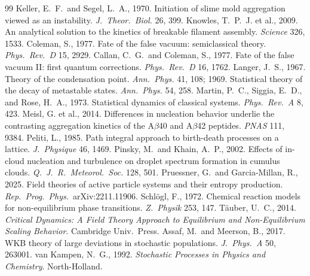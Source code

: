 \documentclass[11pt,a4paper]{article}
\theoremstyle{plain}
\begin{document}
\begin{thebibliography}{99}
 Keller, E.~F.\ and Segel, L.~A., 1970. Initiation of slime mold aggregation viewed as an instability. \textit{J.\ Theor.\ Biol.} 26, 399.
 Knowles, T.~P.~J. et al., 2009. An analytical solution to the kinetics of breakable filament assembly. \textit{Science} 326, 1533.
 Coleman, S., 1977. Fate of the false vacuum: semiclassical theory. \textit{Phys.\ Rev.\ D} 15, 2929.
 Callan, C.~G.\ and Coleman, S., 1977. Fate of the false vacuum II: first quantum corrections. \textit{Phys.\ Rev.\ D} 16, 1762.
 Langer, J.~S., 1967. Theory of the condensation point. \textit{Ann.\ Phys.} 41, 108; 1969. Statistical theory of the decay of metastable states. \textit{Ann.\ Phys.} 54, 258.
 Martin, P.~C., Siggia, E.~D., and Rose, H.~A., 1973. Statistical dynamics of classical systems. \textit{Phys.\ Rev.\ A} 8, 423.
 Meisl, G. et al., 2014. Differences in nucleation behavior underlie the contrasting aggregation kinetics of the A$\beta$40 and A$\beta$42 peptides. \textit{PNAS} 111, 9384.
 Peliti, L., 1985. Path integral approach to birth-death processes on a lattice. \textit{J.\ Physique} 46, 1469.
 Pinsky, M.\ and Khain, A.~P., 2002. Effects of in-cloud nucleation and turbulence on droplet spectrum formation in cumulus clouds. \textit{Q.\ J.\ R.\ Meteorol.\ Soc.} 128, 501.
 Pruessner, G.\ and Garcia-Millan, R., 2025. Field theories of active particle systems and their entropy production. \textit{Rep.\ Prog.\ Phys.}\ arXiv:2211.11906.
 Schl\"ogl, F., 1972. Chemical reaction models for non-equilibrium phase transitions. \textit{Z.\ Physik} 253, 147.
 T\"auber, U.~C., 2014. \textit{Critical Dynamics: A Field Theory Approach to Equilibrium and Non-Equilibrium Scaling Behavior}. Cambridge Univ.\ Press.
 Assaf, M.\ and Meerson, B., 2017. WKB theory of large deviations in stochastic populations. \textit{J.\ Phys.\ A} 50, 263001.
 van Kampen, N.~G., 1992. \textit{Stochastic Processes in Physics and Chemistry}. North-Holland.

\end{thebibliography}
\end{document}
